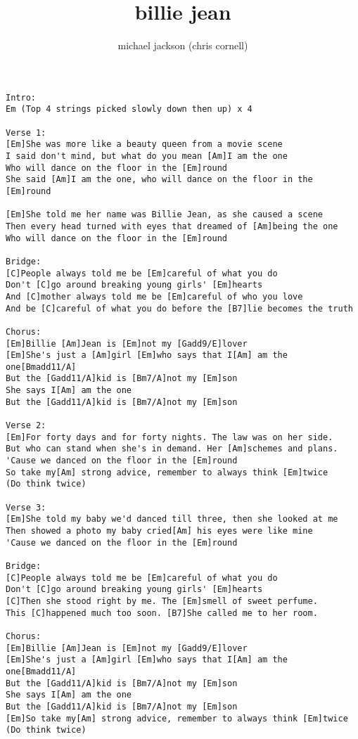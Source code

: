 \author{michael jackson (chris cornell)}
\title{billie jean}
\maketitle
\begin{verbatim}
Intro:
Em (Top 4 strings picked slowly down then up) x 4

Verse 1:
[Em]She was more like a beauty queen from a movie scene
I said don't mind, but what do you mean [Am]I am the one
Who will dance on the floor in the [Em]round
She said [Am]I am the one, who will dance on the floor in the [Em]round

[Em]She told me her name was Billie Jean, as she caused a scene
Then every head turned with eyes that dreamed of [Am]being the one
Who will dance on the floor in the [Em]round

Bridge:
[C]People always told me be [Em]careful of what you do
Don't [C]go around breaking young girls' [Em]hearts
And [C]mother always told me be [Em]careful of who you love
And be [C]careful of what you do before the [B7]lie becomes the truth

Chorus:
[Em]Billie [Am]Jean is [Em]not my [Gadd9/E]lover
[Em]She's just a [Am]girl [Em]who says that I[Am] am the one[Bmadd11/A]
But the [Gadd11/A]kid is [Bm7/A]not my [Em]son
She says I[Am] am the one
But the [Gadd11/A]kid is [Bm7/A]not my [Em]son

Verse 2:
[Em]For forty days and for forty nights. The law was on her side.
But who can stand when she's in demand. Her [Am]schemes and plans.
'Cause we danced on the floor in the [Em]round
So take my[Am] strong advice, remember to always think [Em]twice
(Do think twice)

Verse 3:
[Em]She told my baby we'd danced till three, then she looked at me
Then showed a photo my baby cried[Am] his eyes were like mine
'Cause we danced on the floor in the [Em]round

Bridge:
[C]People always told me be [Em]careful of what you do
Don't [C]go around breaking young girls' [Em]hearts
[C]Then she stood right by me. The [Em]smell of sweet perfume.
This [C]happened much too soon. [B7]She called me to her room.

Chorus:
[Em]Billie [Am]Jean is [Em]not my [Gadd9/E]lover
[Em]She's just a [Am]girl [Em]who says that I[Am] am the one[Bmadd11/A]
But the [Gadd11/A]kid is [Bm7/A]not my [Em]son
She says I[Am] am the one
But the [Gadd11/A]kid is [Bm7/A]not my [Em]son
[Em]So take my[Am] strong advice, remember to always think [Em]twice
(Do think twice)
\end{verbatim}


